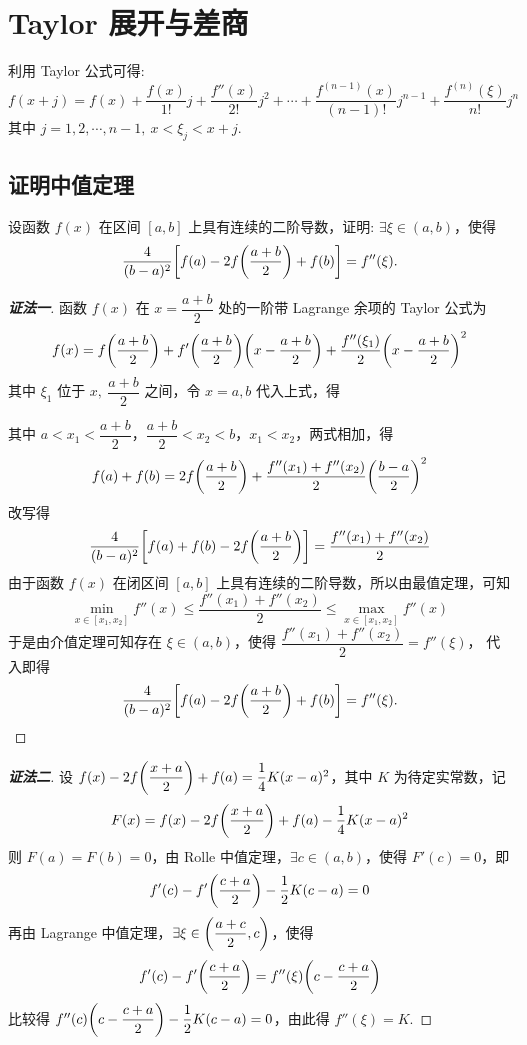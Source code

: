 \section{Taylor 展开与差商}

\begin{theorem}
    利用 Taylor 公式可得:
    $$f\left( x+j\right) =f(x) +\dfrac{f(x) }{1!}j+\dfrac{f''(x) }{2!}j^{2}+\cdots +\dfrac{f^{\left( n-1\right) }(x) }{\left( n-1\right) !}j^{n-1}+\dfrac{f^{(n) }(\xi ) }{n!}j^{n}$$
    其中 $j=1,2,\cdots,n-1,~x<\xi_j<x+j.$
\end{theorem}

\subsection{证明中值定理}

\begin{example}
    设函数 $f(x)$ 在区间 $[a,b]$ 上具有连续的二阶导数，证明: $\exists\xi\in(a,b)$，使得
    $$\dfrac{4}{(b-a)^2}\qty[f(a)-2f\qty(\dfrac{a+b}{2})+f(b)]=f''(\xi).$$
\end{example}
\begin{proof}[{\songti \textbf{证法一}}]
    函数 $f(x)$ 在 $x=\dfrac{a+b}{2}$ 处的一阶带 Lagrange 余项的 Taylor 公式为
    $$f(x)=f\qty(\dfrac{a+b}{2})+f'\qty(\dfrac{a+b}{2})\qty(x-\dfrac{a+b}{2})+\dfrac{f''(\xi_1)}{2}\qty(x-\dfrac{a+b}{2})^2$$
    其中 $\xi_1$ 位于 $x,~\dfrac{a+b}{2}$ 之间，令 $x=a,b$ 代入上式，得
    其中 $a<x_1<\dfrac{a+b}{2}$，$\dfrac{a+b}{2}<x_2<b$，$x_1<x_2$，两式相加，得
    $$f(a)+f(b)=2f\qty(\dfrac{a+b}{2})+\dfrac{f''(x_1)+f''(x_2)}{2}\qty(\dfrac{b-a}{2})^2$$
    改写得 $$\dfrac{4}{(b-a)^2}\qty[f(a)+f(b)-2f\qty(\dfrac{a+b}{2})]=\dfrac{f''(x_1)+f''(x_2)}{2}$$
    由于函数 $f(x)$ 在闭区间 $[a,b]$ 上具有连续的二阶导数，所以由最值定理，可知
    $$\min_{x\in[x_1,x_2]}f''(x)\leqslant \dfrac{f''(x_1)+f''(x_2)}{2}\leqslant \max_{x\in[x_1,x_2]}f''(x)$$
    于是由介值定理可知存在 $\xi\in(a,b)$，使得 $\displaystyle \dfrac{f''(x_1)+f''(x_2)}{2}=f''(\xi)$，
    代入即得 $$\dfrac{4}{(b-a)^2}\qty[f(a)-2f\qty(\dfrac{a+b}{2})+f(b)]=f''(\xi).$$
\end{proof}
\begin{proof}[{\songti \textbf{证法二}}]
    设 $f(x)-2f\qty(\dfrac{x+a}{2})+f(a)=\dfrac{1}{4}K(x-a)^2$，其中 $K$ 为待定实常数，记
    $$F(x)=f(x)-2f\qty(\dfrac{x+a}{2})+f(a)-\dfrac{1}{4}K(x-a)^2$$
    则 $F(a)=F(b)=0$，由 Rolle 中值定理，$\exists c\in(a,b)$，使得 $F'(c)=0$，即
    $$f'(c)-f'\qty(\dfrac{c+a}{2})-\dfrac{1}{2}K(c-a)=0$$
    再由 Lagrange 中值定理，$\exists \xi\in\qty(\dfrac{a+c}{2},c)$，使得
    $$f'(c)-f'\qty(\dfrac{c+a}{2})=f''(\xi)\qty(c-\dfrac{c+a}{2})$$
    比较得 $f''(c)\qty(c-\dfrac{c+a}{2})-\dfrac{1}{2}K(c-a)=0$，由此得 $f''(\xi)=K.$
\end{proof}

